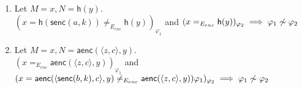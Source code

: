\begin{enumerate}
    \item Let $M = x, N = \mathsf{h}(y)$. \\
        $(x = \mathsf{h}(\mathsf{senc}(a, k)) \neq_{E_{enc}} \mathsf{h}(y))_{\varphi_1}$
        and
        $(x =_{E_{enc}} \mathsf{h}(y))_{\varphi_2}
        \implies \varphi_1 \centernot\sim \varphi_2$
    \item Let $M = x, N = \mathsf{aenc}(\langle z, c \rangle, y)$. \\
        $(x =_{E_{enc}} \mathsf{aenc}(\langle z, c \rangle, y))_{\varphi_1}$
        and
        $(x = \mathsf{aenc}(\langle \mathsf{senc}(b, k), c \rangle, y) \neq_{E_{enc}} \mathsf{aenc}(\langle z, c \rangle, y))\varphi_1)_{\varphi_2} \\
        \implies \varphi_1 \centernot\sim \varphi_2$
\end{enumerate}
